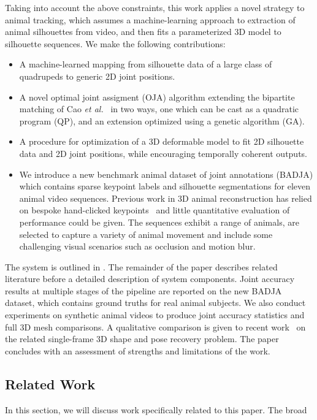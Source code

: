 Taking into account the above constraints, this work applies a novel strategy to animal tracking, which assumes a machine-learning approach to extraction of animal silhouettes from video, and then fits a parameterized 3D model to silhouette sequences.  We make the following contributions:
\begin{itemize}
\item A machine-learned mapping from silhouette data of a large class of quadru\-peds to generic 2D joint positions.
\item A novel optimal joint assigment (OJA) algorithm extending the bipartite matching of Cao {\em et al.}~\cite{cao2017realtime} in two ways, one which can be cast as a quadratic program (QP), and an extension optimized using a genetic algorithm (GA).
\item A procedure for optimization of a 3D deformable model to fit 2D silhouette data and 2D joint positions, while encouraging temporally coherent outputs.
\item We introduce a new benchmark animal dataset of joint annotations (BADJA) which contains sparse keypoint labels and silhouette segmentations for eleven animal video sequences. 
Previous work in 3D animal reconstruction has relied on bespoke hand-clicked keypoints~\cite{zuffi2017menagerie,zuffi_lions} and little quantitative evaluation of performance could be given.
The sequences exhibit a range of animals, are selected to capture a variety of animal movement and include some challenging visual scenarios such as occlusion and motion blur.
\end{itemize}
The system is outlined in .  The remainder of the paper describes related literature before a detailed description of system components.  Joint accuracy results at multiple stages of the pipeline are reported on the new BADJA dataset, which contains ground truths for real animal subjects. We also conduct experiments on synthetic animal videos to produce joint accuracy statistics and full 3D mesh comparisons. A qualitative comparison is given to recent work~\cite{zuffi2017menagerie} on the related single-frame 3D shape and pose recovery problem. The paper concludes with an assessment of strengths and limitations of the work.

\subsection{Related Work}
In this section, we will discuss work specifically related to this paper. The broad 

